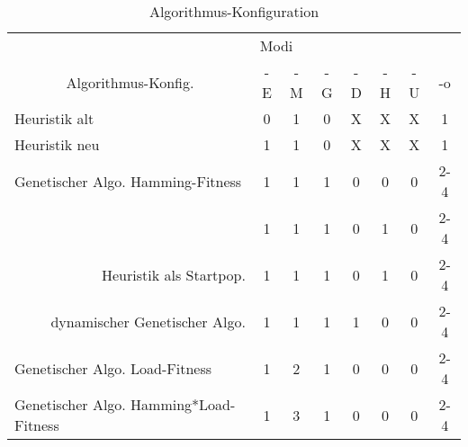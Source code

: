 	\begin{table}[htp]
		\centering
		\begin{tabular}{ccccccccc}
			\multicolumn{2}{l}{}                 & \multicolumn{7}{|l}{Modi}                                                               \\ 
			\multicolumn{2}{c}{Algorithmus-Konfig.}  & \multicolumn{1}{|c}{-E} & \multicolumn{1}{c}{-M} & \multicolumn{1}{c}{-G} & \multicolumn{1}{c}{-D} & \multicolumn{1}{c}{-H} & \multicolumn{1}{c}{-U} & \multicolumn{1}{c}{-o} \\ 
			\hline
		\multicolumn{2}{l}{Heuristik alt}  & \multicolumn{1}{|c}{0} & \multicolumn{1}{c}{1} & \multicolumn{1}{c}{0} & \multicolumn{1}{c}{X} & \multicolumn{1}{c}{X} & \multicolumn{1}{c}{X} & \multicolumn{1}{c}{1} \\
		\multicolumn{2}{l}{Heuristik neu}  & \multicolumn{1}{|c}{1} & \multicolumn{1}{c}{1} & \multicolumn{1}{c}{0} & \multicolumn{1}{c}{X} & \multicolumn{1}{c}{X} & \multicolumn{1}{c}{X} & \multicolumn{1}{c}{1} \\ 
		\multicolumn{2}{l}{Genetischer Algo. Hamming-Fitness}  & \multicolumn{1}{|c}{1} & \multicolumn{1}{c}{1} & \multicolumn{1}{c}{1} & \multicolumn{1}{c}{0} & \multicolumn{1}{c}{0} & \multicolumn{1}{c}{0} & \multicolumn{1}{c}{2-4} \\
			\multicolumn{2}{r}{}  & \multicolumn{1}{|c}{1} & \multicolumn{1}{c}{1} & \multicolumn{1}{c}{1} & \multicolumn{1}{c}{0} & \multicolumn{1}{c}{1} & \multicolumn{1}{c}{0} & \multicolumn{1}{c}{2-4} \\
			\multicolumn{2}{r}{Heuristik als Startpop.}  & \multicolumn{1}{|c}{1} & \multicolumn{1}{c}{1} & \multicolumn{1}{c}{1} & \multicolumn{1}{c}{0} & \multicolumn{1}{c}{1} & \multicolumn{1}{c}{0} & \multicolumn{1}{c}{2-4} \\
			\multicolumn{2}{r}{dynamischer Genetischer Algo.}  & \multicolumn{1}{|c}{1} & \multicolumn{1}{c}{1} & \multicolumn{1}{c}{1} & \multicolumn{1}{c}{1} & \multicolumn{1}{c}{0} & \multicolumn{1}{c}{0} & \multicolumn{1}{c}{2-4} \\
		\multicolumn{2}{l}{Genetischer Algo. Load-Fitness}  & \multicolumn{1}{|c}{1} & \multicolumn{1}{c}{2} & \multicolumn{1}{c}{1} & \multicolumn{1}{c}{0} & \multicolumn{1}{c}{0} & \multicolumn{1}{c}{0} & \multicolumn{1}{c}{2-4} \\ 
		\multicolumn{2}{l}{Genetischer Algo. Hamming*Load-Fitness}  & \multicolumn{1}{|c}{1} & \multicolumn{1}{c}{3} & \multicolumn{1}{c}{1} & \multicolumn{1}{c}{0} & \multicolumn{1}{c}{0} & \multicolumn{1}{c}{0} & \multicolumn{1}{c}{2-4}                     
		\end{tabular}
		\newline
		\caption{Algorithmus-Konfiguration}
	\end{table}

